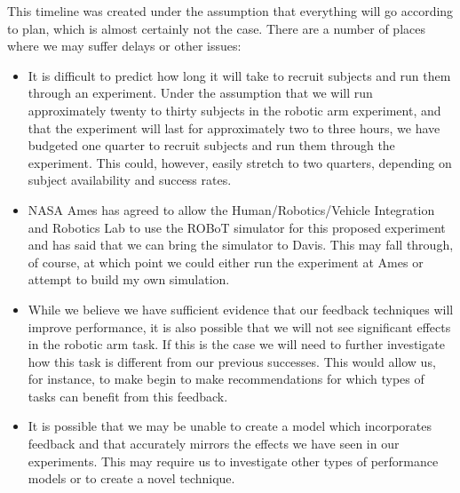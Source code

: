 \documentclass[float=false, crop=false]{standalone}
\begin{document}
This timeline was created under the assumption that everything will go according to plan, which is almost certainly not the case.
There are a number of places where we may suffer delays or other issues:
\begin{itemize}
\item It is difficult to predict how long it will take to recruit subjects and run them through an experiment.
Under the assumption that we will run approximately twenty to thirty subjects in the robotic arm experiment, and that the experiment will last for approximately two to three hours, we have budgeted one quarter to recruit subjects and run them through the experiment.
This could, however, easily stretch to two quarters, depending on subject availability and success rates.
\item NASA Ames has agreed to allow the Human/Robotics/Vehicle Integration and Robotics Lab to use the ROBoT simulator for this proposed experiment and has said that we can bring the simulator to Davis.
This may fall through, of course, at which point we could either run the experiment at Ames or attempt to build my own simulation.
\item While we believe we have sufficient evidence that our feedback techniques will improve performance, it is also possible that we will not see significant effects in the robotic arm task.
If this is the case we will need to further investigate how this task is different from our previous successes.
This would allow us, for instance, to make begin to make recommendations for which types of tasks can benefit from this feedback.
\item It is possible that we may be unable to create a model which incorporates feedback and that accurately mirrors the effects we have seen in our experiments. This may require us to investigate other types of performance models or to create a novel technique.
\end{itemize}
\end{document}
